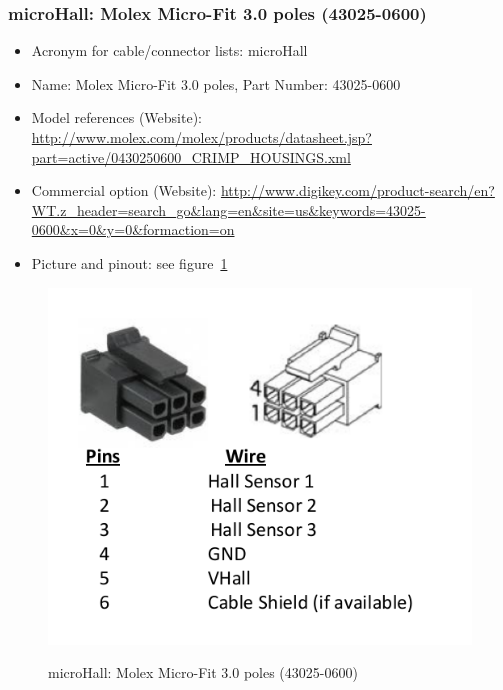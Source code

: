 \subsubsection{microHall: Molex Micro-Fit 3.0 poles (43025-0600)} \label{DEVICE:microHall}
\begin{itemize}
  \item Acronym for cable/connector lists: microHall
  \item Name: Molex Micro-Fit 3.0 poles, Part Number: 43025-0600
  \item Model references (Website): \href{http://www.molex.com/molex/products/datasheet.jsp?part=active/0430250600\_CRIMP\_HOUSINGS.xml}{http://www.molex.com/molex/products/datasheet.jsp?part=active/0430250600\_CRIMP\_HOUSINGS.xml}
  \item Commercial option (Website): \href{http://www.digikey.com/product-search/en?WT.z\_header=search\_go\&lang=en\&site=us\&keywords=43025-0600\&x=0\&y=0\&formaction=on}{http://www.digikey.com/product-search/en?WT.z\_header=search\_go\&lang=en\&site=us\&keywords=43025-0600\&x=0\&y=0\&formaction=on}
  \item Picture and pinout: see figure~\ref{FIG:DEVICEmicroHall}
\end{itemize}
\begin{figure}
  \centering
  \includegraphics[angle=90,width=1\columnwidth]{figs/body02/FIGDEVICEmicroHall.pdf}\\
  \caption[microHall: Molex Micro-Fit 3.0 poles (43025-0600)]{microHall: Molex Micro-Fit 3.0 poles (43025-0600)}
  \label{FIG:DEVICEmicroHall}
\end{figure}
